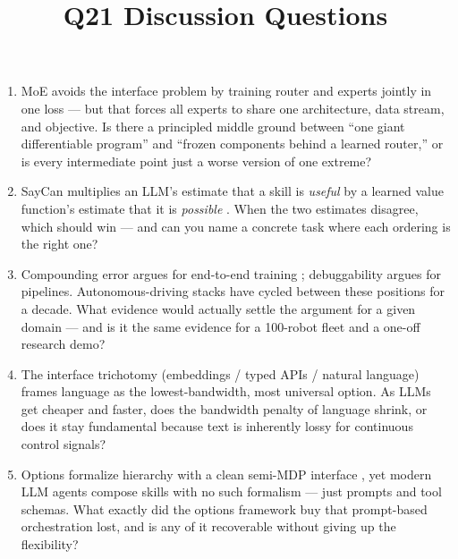 \documentclass[11pt]{article}
\title{Q21 Discussion Questions}
\date{}
\begin{document}
\maketitle
\begin{enumerate}[noitemsep]
\item MoE avoids the interface problem by training router and experts jointly in one loss --- but that forces all experts to share one architecture, data stream, and objective. Is there a principled middle ground between ``one giant differentiable program'' and ``frozen components behind a learned router,'' or is every intermediate point just a worse version of one extreme?
\item SayCan multiplies an LLM's estimate that a skill is \emph{useful} by a learned value function's estimate that it is \emph{possible} \cite{ahn2022saycan}. When the two estimates disagree, which should win --- and can you name a concrete task where each ordering is the right one?
\item Compounding error argues for end-to-end training \cite{levine2016end}; debuggability argues for pipelines. Autonomous-driving stacks have cycled between these positions for a decade. What evidence would actually settle the argument for a given domain --- and is it the same evidence for a 100-robot fleet and a one-off research demo?
\item The interface trichotomy (embeddings / typed APIs / natural language) frames language as the lowest-bandwidth, most universal option. As LLMs get cheaper and faster, does the bandwidth penalty of language shrink, or does it stay fundamental because text is inherently lossy for continuous control signals?
\item Options formalize hierarchy with a clean semi-MDP interface \cite{sutton1999options}, yet modern LLM agents compose skills with no such formalism --- just prompts and tool schemas. What exactly did the options framework buy that prompt-based orchestration lost, and is any of it recoverable without giving up the flexibility?
\end{enumerate}
\end{document}
